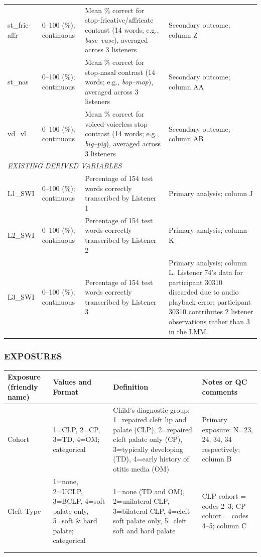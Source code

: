 \documentclass{article}
\begin{document}
\begin{longtable}{p{2cm} p{2cm} p{5cm} p{5cm}}
st\_fric-affr & 0--100 (\%); continuous & Mean \% correct for stop-fricative/affricate contrast (14 words; e.g., \textit{base--vase}), averaged across 3 listeners & Secondary outcome; column Z \\[1em]
st\_nas & 0--100 (\%); continuous & Mean \% correct for stop-nasal contrast (14 words; e.g., \textit{bop--mop}), averaged across 3 listeners & Secondary outcome; column AA \\[1em]
vd\_vl & 0--100 (\%); continuous & Mean \% correct for voiced-voiceless stop contrast (14 words; e.g., \textit{big--pig}), averaged across 3 listeners & Secondary outcome; column AB \\[1em]
\midrule
\midrule
\multicolumn{4}{l}{\textit{EXISTING DERIVED VARIABLES}} \\[0.5em]
L1\_SWI & 0--100 (\%); continuous & Percentage of 154 test words correctly 
transcribed by Listener 1 & Primary 
analysis; column J \\[1em]
L2\_SWI & 0--100 (\%); continuous & Percentage of 154 test words correctly 
transcribed by Listener 2 & Primary 
analysis; column K \\[1em]
L3\_SWI & 0--100 (\%); continuous & Percentage of 154 test words correctly 
transcribed by Listener 3 & Primary 
analysis; column L. Listener 74's data for participant 
30310 discarded due to audio playback error; participant 30310 contributes 
2 listener observations rather than 3 in the LMM. \\[1em]
\bottomrule
\end{longtable}

\subsubsection*{EXPOSURES}
\begin{tabular}{p{2cm} p{2cm} p{5cm} p{5cm}}
\toprule
\textbf{Exposure (friendly name)} & \textbf{Values and Format} & \textbf{Definition} & \textbf{Notes or QC comments} \\
\midrule
Cohort & 1=CLP, 2=CP, 3=TD, 4=OM; categorical & Child's diagnostic group: 1=repaired cleft lip and palate (CLP), 2=repaired cleft palate only (CP), 3=typically developing (TD), 4=early history of otitis media (OM) & Primary exposure; N=23, 24, 34, 34 respectively; column B \\[1em]
Cleft Type & 1=none, 2=UCLP, 3=BCLP, 4=soft palate only, 5=soft \& hard palate; categorical & 1=none (TD and OM), 2=unilateral CLP, 3=bilateral CLP, 4=cleft soft palate only, 5=cleft soft and hard palate & CLP cohort = codes 2--3; CP cohort = codes 4--5; column C  \\[1em]
& & & \\[1em]
& & & \\
\bottomrule
\end{tabular}
\end{document}
